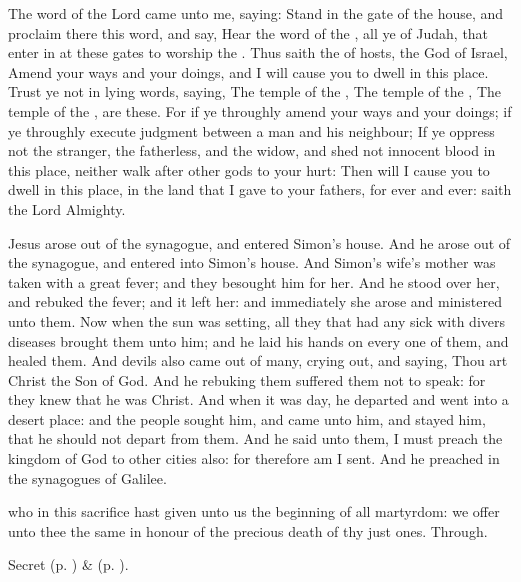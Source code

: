  The word of the Lord came unto me, saying: Stand in the gate of the  house, and proclaim there this word, and say, Hear the word of the , all ye of Judah, that enter in at these gates to worship the . Thus saith the  of hosts, the God of Israel, Amend your ways and your doings, and I will cause you to dwell in this place. Trust ye not in lying words, saying, The temple of the , The temple of the , The temple of the , are these. For if ye throughly amend your ways and your doings; if ye throughly execute judgment between a man and his neighbour; If ye oppress not the stranger, the fatherless, and the widow, and shed not innocent blood in this place, neither walk after other gods to your hurt: Then will I cause you to dwell in this place, in the land that I gave to your fathers, for ever and ever: saith the Lord Almighty.


 Jesus arose out of the synagogue, and entered Simon's house. And he arose out of the synagogue, and entered into Simon's house. And Simon's wife's mother was taken with a great fever; and they besought him for her. And he stood over her, and rebuked the fever; and it left her: and immediately she arose and ministered unto them. Now when the sun was setting, all they that had any sick with divers diseases brought them unto him; and he laid his hands on every one of them, and healed them. And devils also came out of many, crying out, and saying, Thou art Christ the Son of God. And he rebuking them suffered them not to speak: for they knew that he was Christ. And when it was day, he departed and went into a desert place: and the people sought him, and came unto him, and stayed him, that he should not depart from them. And he said unto them, I must preach the kingdom of God to other cities also: for therefore am I sent. And he preached in the synagogues of Galilee.


\secret
{} who in this sacrifice hast given unto us the beginning of all martyrdom: we offer unto thee the same in honour of the precious death of thy just ones. Through.
\begin{rubric}
     Secret  (p. \pageref{AshWednesdayMassSecret}) \&   (p. \pageref{SPLivingDeparted}).
\end{rubric}

